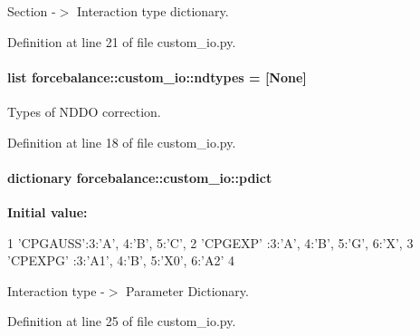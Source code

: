\-Section -\/$>$ \-Interaction type dictionary. 



\-Definition at line 21 of file custom\-\_\-io.\-py.

\hypertarget{namespaceforcebalance_1_1custom__io_a604fd5cd1f0c6057a8a72ac61b55f6fa}{
\paragraph[{ndtypes}]{\setlength{\rightskip}{0pt plus 5cm}list {\bf forcebalance\-::custom\-\_\-io\-::ndtypes} = \mbox{[}\-None\mbox{]}}}\label{namespaceforcebalance_1_1custom__io_a604fd5cd1f0c6057a8a72ac61b55f6fa}


\-Types of \-N\-D\-D\-O correction. 



\-Definition at line 18 of file custom\-\_\-io.\-py.

\hypertarget{namespaceforcebalance_1_1custom__io_aaa87b8099dee5dfec42f5869dabad0c5}{
\paragraph[{pdict}]{\setlength{\rightskip}{0pt plus 5cm}dictionary {\bf forcebalance\-::custom\-\_\-io\-::pdict}}}\label{namespaceforcebalance_1_1custom__io_aaa87b8099dee5dfec42f5869dabad0c5}
{\bfseries \-Initial value\-:}
\begin{DoxyCode}
1 {'CPGAUSS':{3:'A', 4:'B', 5:'C'},
2          'CPGEXP' :{3:'A', 4:'B', 5:'G', 6:'X'},
3          'CPEXPG' :{3:'A1', 4:'B', 5:'X0', 6:'A2'}
4          }
\end{DoxyCode}


\-Interaction type -\/$>$ \-Parameter \-Dictionary. 



\-Definition at line 25 of file custom\-\_\-io.\-py.

